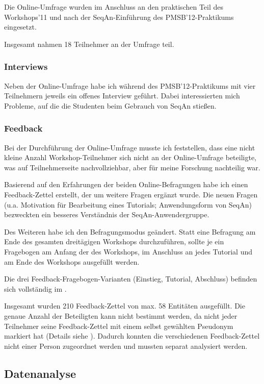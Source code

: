 Die Online-Umfrage wurden im Anschluss an den praktischen Teil des Workshops'11 und nach der SeqAn-Einführung des PMSB'12-Praktikums eingesetzt.

Insgesamt nahmen 18 Teilnehmer an der Umfrage teil.


\subsubsection{Interviews}

Neben der Online-Umfrage habe ich während des PMSB'12-Praktikums mit vier Teilnehmern jeweils ein offenes Interview \citep{mayring2002einfhrung} geführt. Dabei interessierten mich Probleme, auf die die Studenten beim Gebrauch von SeqAn stießen.


\subsubsection{Feedback}
\label{sec:feedback}

Bei der Durchführung der Online-Umfrage musste ich feststellen, dass eine nicht kleine Anzahl Workshop-Teilnehmer sich nicht an der Online-Umfrage beteiligte, was auf Teilnehmerseite nachvollziehbar, aber für meine Forschung nachteilig war.

Basierend auf den Erfahrungen der beiden Online-Befragungen habe ich einen Feedback-Zettel erstellt, der um weitere Fragen ergänzt wurde. Die neuen Fragen (u.a. Motivation für Bearbeitung eines Tutorials; Anwendungsform von SeqAn) bezweckten ein besseres Verständnis der SeqAn-Anwendergruppe.

Des Weiteren habe ich den Befragungsmodus geändert. Statt eine Befragung am Ende des gesamten dreitägigen Workshops durchzuführen, sollte je ein Fragebogen am Anfang der des Workshops, im Anschluss an jedes Tutorial und am Ende des Workshops ausgefüllt werden.

Die drei Feedback-Fragebogen-Varianten (Einstieg, Tutorial, Abschluss) befinden sich vollständig im .

Insgesamt wurden 210 Feedback-Zettel von max. 58 Entitäten ausgefüllt. Die genaue Anzahl der Beteiligten kann nicht bestimmt werden, da nicht jeder Teilnehmer seine Feedback-Zettel mit einem selbst gewählten Pseudonym markiert hat (Details siehe ). Dadurch konnten die verschiedenen Feedback-Zettel nicht einer Person zugeordnet werden und mussten separat analysiert werden.


      
\subsection{Datenanalyse}
\label{sec:he}

